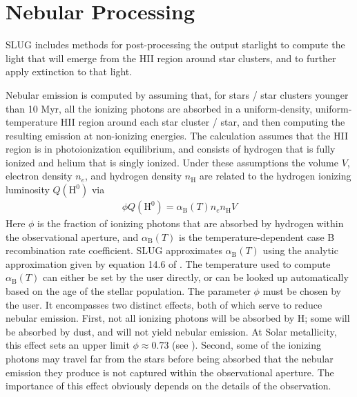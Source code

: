 \documentclass[letterpaper,10pt,english]{sphinxmanual}
\begin{document}
\section{Nebular Processing}
\label{\detokenize{intro:ssec-nebula}}\label{\detokenize{intro:nebular-processing}}
SLUG includes methods for post-processing the output starlight to compute the light that will emerge from the HII region around star clusters, and to further apply extinction to that light.

Nebular emission is computed by assuming that, for stars / star clusters younger than 10 Myr, all the ionizing photons are absorbed in a uniform-density, uniform-temperature HII region around each star cluster / star, and then computing the resulting emission at non-ionizing energies. The calculation assumes that the HII region is in photoionization equilibrium, and consists of hydrogen that is fully ionized and helium that is singly ionized. Under these assumptions the volume \(V\), electron density \(n_e\), and hydrogen density \(n_{\mathrm{H}}\) are related to the hydrogen ionizing luminosity \(Q(\mathrm{H}^0)\) via
\begin{equation*}
\begin{split}\phi Q(\mathrm{H}^0) = \alpha_{\mathrm{B}}(T) n_e n_{\mathrm{H}} V\end{split}
\end{equation*}
Here \(\phi\) is the fraction of ionizing photons that are absorbed by hydrogen within the observational aperture, and \(\alpha_{\mathrm{B}}(T)\) is the temperature-dependent case B recombination rate coefficient. SLUG approximates \(\alpha_{\mathrm{B}}(T)\) using the analytic approximation given by equation 14.6 of . The temperature used to compute \(\alpha_{\mathrm{B}}(T)\) can either be set by the user directly, or can be looked up automatically based on the age of the stellar population. The parameter \(\phi\) must be chosen by the user. It encompasses two distinct effects, both of which serve to reduce nebular emission. First, not all ionizing photons will be absorbed by H; some will be absorbed by dust, and will not yield nebular emission. At Solar metallicity, this effect sets an upper limit \(\phi\approx 0.73\) (see ). Second, some of the ionizing photons may travel far from the stars before being absorbed that the nebular emission they produce is not captured within the observational aperture. The importance of this effect obviously depends on the details of the observation.
\end{document}
